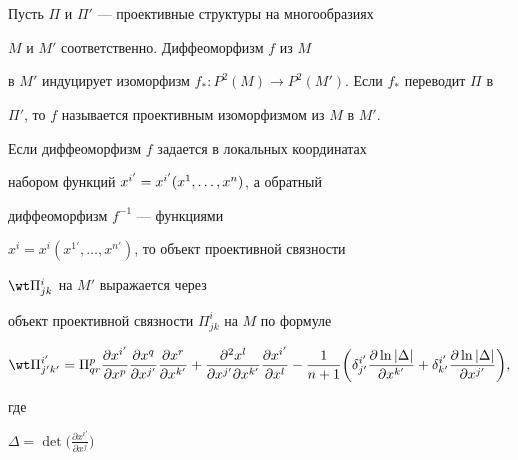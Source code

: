 \section{}\label{par2}





Пусть $\Pi $ и $\Pi '$ --- проективные структуры на многообразиях


$M$ и $M'$ соответственно. Диффеоморфизм $f$ из $M$


в $M'$ индуцирует изоморфизм $f_{*}: P^{2}(M)


\rightarrow P^{2}(M')$. Если $f_{*}$ переводит $\Pi $ в


$\Pi '$, то $f$ называется проективным изоморфизмом из $M$ в $M'$.





Если диффеоморфизм $f$ задается в локальных координатах


набором функций $x^{i'}=\linebreak x^{i'}(x^1,\dotsc,x^n)$, а обратный


диффеоморфизм $f^{-1}$ --- функциями


$x^i=x^i(x^{1'},\dotsc,x^{n'})$, то объект проективной связности


$\wt\Pi^i_{jk}$ на $M'$ выражается через


объект проективной связности $\Pi^i_{jk}$ на $M$ по формуле 


\begin{equation}\label{uvl}


{\wt\Pi}{}^{i'}_{j'k'} =\Pi ^{p}_{qr}


\frac{\partial x^{i'}}{\partial x^p}


\frac{\partial x^{q}}{\partial x^{j'}}\frac{\partial x^{r}}{


\partial x^{k'}}+ \frac{\partial ^2 x^{l}}{\partial x^{j'}\partial


x^{k'}} \frac{\partial x^{i'}}{\partial x^l} -


\frac{1}{n+1}\bigg(\delta^{i'}_{j'}


\frac{\partial \ln|\Delta|}{\partial x^{k'}}+ \delta^{i'}_{k'}


\frac{\partial \ln| \Delta|}{\partial x^{j'}}\bigg),


\end{equation}


где


$\Delta =\det \big(\frac{\partial x^{i'}}{\partial x^j}\big)$


